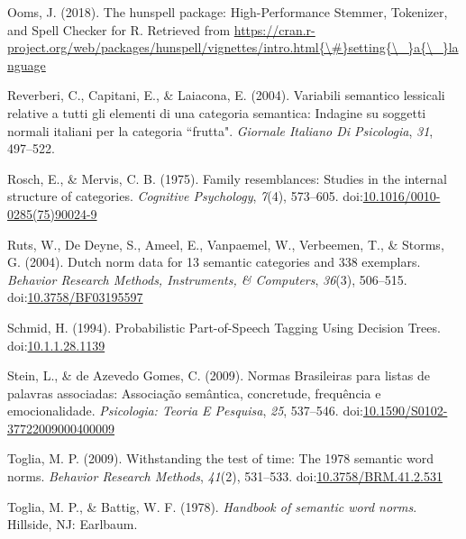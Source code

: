 \documentclass[man]{apa6}
\begin{document}
\leavevmode\hypertarget{ref-Ooms2018}{}%
Ooms, J. (2018). The hunspell package: High-Performance Stemmer, Tokenizer, and Spell Checker for R. Retrieved from \href{https://cran.r-project.org/web/packages/hunspell/vignettes/intro.html\%7B/\#\%7Dsetting\%7B/_\%7Da\%7B/_\%7Dlanguage}{https://cran.r-project.org/web/packages/hunspell/vignettes/intro.html\{\textbackslash{}\#\}setting\{\textbackslash{}\_\}a\{\textbackslash{}\_\}language}

\leavevmode\hypertarget{ref-Reverberi2004}{}%
Reverberi, C., Capitani, E., \& Laiacona, E. (2004). Variabili semantico lessicali relative a tutti gli elementi di una categoria semantica: Indagine su soggetti normali italiani per la categoria ``frutta". \emph{Giornale Italiano Di Psicologia}, \emph{31}, 497--522.

\leavevmode\hypertarget{ref-Rosch1975}{}%
Rosch, E., \& Mervis, C. B. (1975). Family resemblances: Studies in the internal structure of categories. \emph{Cognitive Psychology}, \emph{7}(4), 573--605. doi:\href{https://doi.org/10.1016/0010-0285(75)90024-9}{10.1016/0010-0285(75)90024-9}

\leavevmode\hypertarget{ref-Ruts2004}{}%
Ruts, W., De Deyne, S., Ameel, E., Vanpaemel, W., Verbeemen, T., \& Storms, G. (2004). Dutch norm data for 13 semantic categories and 338 exemplars. \emph{Behavior Research Methods, Instruments, \& Computers}, \emph{36}(3), 506--515. doi:\href{https://doi.org/10.3758/BF03195597}{10.3758/BF03195597}

\leavevmode\hypertarget{ref-Schmid1994}{}%
Schmid, H. (1994). Probabilistic Part-of-Speech Tagging Using Decision Trees. doi:\href{https://doi.org/10.1.1.28.1139}{10.1.1.28.1139}

\leavevmode\hypertarget{ref-Stein2009}{}%
Stein, L., \& de Azevedo Gomes, C. (2009). Normas Brasileiras para listas de palavras associadas: Associação semântica, concretude, frequência e emocionalidade. \emph{Psicologia: Teoria E Pesquisa}, \emph{25}, 537--546. doi:\href{https://doi.org/10.1590/S0102-37722009000400009}{10.1590/S0102-37722009000400009}

\leavevmode\hypertarget{ref-Toglia2009}{}%
Toglia, M. P. (2009). Withstanding the test of time: The 1978 semantic word norms. \emph{Behavior Research Methods}, \emph{41}(2), 531--533. doi:\href{https://doi.org/10.3758/BRM.41.2.531}{10.3758/BRM.41.2.531}

\leavevmode\hypertarget{ref-Toglia1978}{}%
Toglia, M. P., \& Battig, W. F. (1978). \emph{Handbook of semantic word norms}. Hillside, NJ: Earlbaum.
\end{document}
